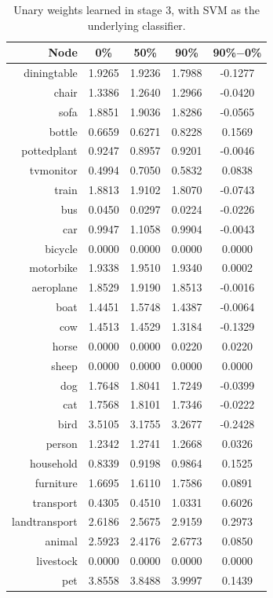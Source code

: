 \documentclass[11pt,a4paper]{book}
\begin{document}
\begin{table}[htbp]
\centering
\begin{tabular}{r|c|c|c|c}
Node & 0\% & 50\% & 90\% & 90\%$-$0\%\\\hline
diningtable   & 1.9265 & 1.9236 & 1.7988 & -0.1277\\
chair         & 1.3386 & 1.2640 & 1.2966 & -0.0420\\
sofa          & 1.8851 & 1.9036 & 1.8286 & -0.0565\\
bottle        & 0.6659 & 0.6271 & 0.8228 & 0.1569\\
pottedplant   & 0.9247 & 0.8957 & 0.9201 & -0.0046\\
tvmonitor     & 0.4994 & 0.7050 & 0.5832 & 0.0838\\
train         & 1.8813 & 1.9102 & 1.8070 & -0.0743\\
bus           & 0.0450 & 0.0297 & 0.0224 & -0.0226\\
car           & 0.9947 & 1.1058 & 0.9904 & -0.0043\\
bicycle       & 0.0000 & 0.0000 & 0.0000 & 0.0000\\
motorbike     & 1.9338 & 1.9510 & 1.9340 & 0.0002\\
aeroplane     & 1.8529 & 1.9190 & 1.8513 & -0.0016\\
boat          & 1.4451 & 1.5748 & 1.4387 & -0.0064\\
cow           & 1.4513 & 1.4529 & 1.3184 & -0.1329\\
horse         & 0.0000 & 0.0000 & 0.0220 & 0.0220\\
sheep         & 0.0000 & 0.0000 & 0.0000 & 0.0000\\
dog           & 1.7648 & 1.8041 & 1.7249 & -0.0399\\
cat           & 1.7568 & 1.8101 & 1.7346 & -0.0222\\
bird          & 3.5105 & 3.1755 & 3.2677 & -0.2428\\
person        & 1.2342 & 1.2741 & 1.2668 & 0.0326\\\hline
household     & 0.8339 & 0.9198 & 0.9864 & 0.1525\\
furniture     & 1.6695 & 1.6110 & 1.7586 & 0.0891\\
transport     & 0.4305 & 0.4510 & 1.0331 & 0.6026\\
landtransport & 2.6186 & 2.5675 & 2.9159 & 0.2973\\
animal        & 2.5923 & 2.4176 & 2.6773 & 0.0850\\
livestock     & 0.0000 & 0.0000 & 0.0000 & 0.0000\\
pet           & 3.8558 & 3.8488 & 3.9997 & 0.1439
\end{tabular}
\caption{Unary weights learned in stage 3, with SVM as the underlying classifier.}
\label{tab:svmunary}
\end{table}
\end{document}
